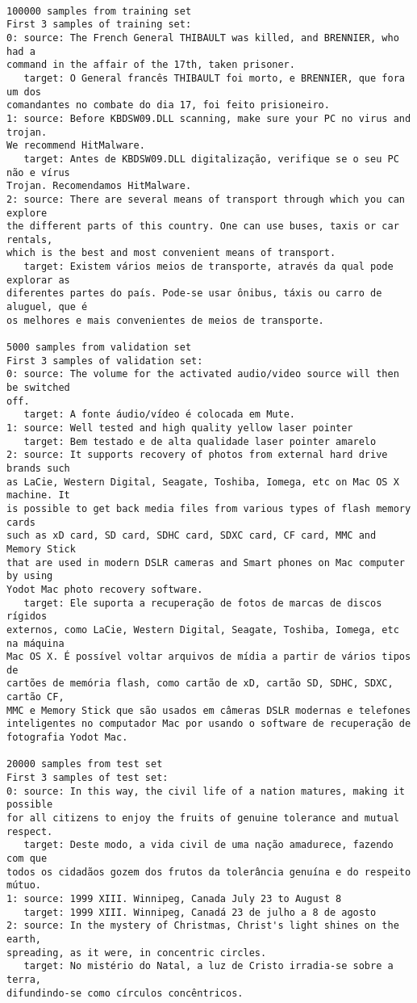 \documentclass[10pt]{article}
\begin{document}
    \begin{Verbatim}[commandchars=\\\{\}]

100000 samples from training set
First 3 samples of training set:
0: source: The French General THIBAULT was killed, and BRENNIER, who had a
command in the affair of the 17th, taken prisoner.
   target: O General francês THIBAULT foi morto, e BRENNIER, que fora um dos
comandantes no combate do dia 17, foi feito prisioneiro.
1: source: Before KBDSW09.DLL scanning, make sure your PC no virus and trojan.
We recommend HitMalware.
   target: Antes de KBDSW09.DLL digitalização, verifique se o seu PC não e vírus
Trojan. Recomendamos HitMalware.
2: source: There are several means of transport through which you can explore
the different parts of this country. One can use buses, taxis or car rentals,
which is the best and most convenient means of transport.
   target: Existem vários meios de transporte, através da qual pode explorar as
diferentes partes do país. Pode-se usar ônibus, táxis ou carro de aluguel, que é
os melhores e mais convenientes de meios de transporte.

5000 samples from validation set
First 3 samples of validation set:
0: source: The volume for the activated audio/video source will then be switched
off.
   target: A fonte áudio/vídeo é colocada em Mute.
1: source: Well tested and high quality yellow laser pointer
   target: Bem testado e de alta qualidade laser pointer amarelo
2: source: It supports recovery of photos from external hard drive brands such
as LaCie, Western Digital, Seagate, Toshiba, Iomega, etc on Mac OS X machine. It
is possible to get back media files from various types of flash memory cards
such as xD card, SD card, SDHC card, SDXC card, CF card, MMC and Memory Stick
that are used in modern DSLR cameras and Smart phones on Mac computer by using
Yodot Mac photo recovery software.
   target: Ele suporta a recuperação de fotos de marcas de discos rígidos
externos, como LaCie, Western Digital, Seagate, Toshiba, Iomega, etc na máquina
Mac OS X. É possível voltar arquivos de mídia a partir de vários tipos de
cartões de memória flash, como cartão de xD, cartão SD, SDHC, SDXC, cartão CF,
MMC e Memory Stick que são usados em câmeras DSLR modernas e telefones
inteligentes no computador Mac por usando o software de recuperação de
fotografia Yodot Mac.

20000 samples from test set
First 3 samples of test set:
0: source: In this way, the civil life of a nation matures, making it possible
for all citizens to enjoy the fruits of genuine tolerance and mutual respect.
   target: Deste modo, a vida civil de uma nação amadurece, fazendo com que
todos os cidadãos gozem dos frutos da tolerância genuína e do respeito mútuo.
1: source: 1999 XIII. Winnipeg, Canada July 23 to August 8
   target: 1999 XIII. Winnipeg, Canadá 23 de julho a 8 de agosto
2: source: In the mystery of Christmas, Christ's light shines on the earth,
spreading, as it were, in concentric circles.
   target: No mistério do Natal, a luz de Cristo irradia-se sobre a terra,
difundindo-se como círculos concêntricos.
    \end{Verbatim}
\end{document}
